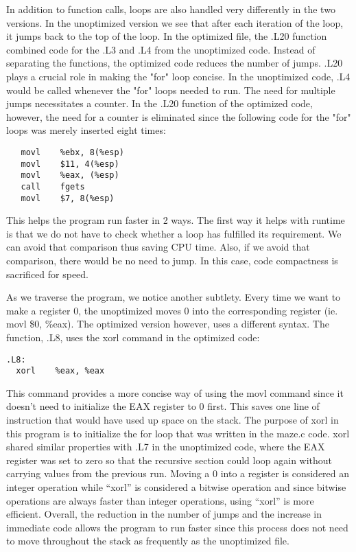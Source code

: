 \documentclass[12pt,letterpaper]{article}
\begin{document}
In addition to function calls, loops are also handled very differently in the two versions. In the unoptimized version we see that after each iteration of the loop, it jumps back to the top of the loop. In the optimized file, the .L20 function combined code for the .L3 and .L4 from the unoptimized code. Instead of separating the functions, the optimized code reduces the number of jumps. .L20 plays a crucial role in making the "for" loop concise. In the unoptimized code, .L4 would be called whenever the "for" loops needed to run. The need for multiple jumps necessitates a counter. In the .L20 function of the optimized code, however, the need for a counter is eliminated since the following code for the "for" loops was merely inserted eight times:
\begin{verbatim}
   movl    %ebx, 8(%esp)
   movl    $11, 4(%esp)
   movl    %eax, (%esp)
   call    fgets
   movl    $7, 8(%esp)
\end{verbatim} 
This helps the program run faster in 2 ways. The first way it helps with runtime is that we do not have to check whether a loop has fulfilled its requirement. We can avoid that comparison thus saving CPU time. Also, if we avoid that comparison, there would be no need to jump. In this case, code compactness is sacrificed for speed.
   
As we traverse the program, we notice another subtlety. Every time we want to make a register 0, the unoptimized moves 0 into the corresponding register (ie. movl \$0, \%eax). The optimized version however, uses a different syntax. The function, .L8, uses the xorl command in the optimized code:
\begin{verbatim}
.L8:
  xorl    %eax, %eax
\end{verbatim}

This command provides a more concise way of using the movl command since it doesn’t need to initialize the EAX register to 0 first. This saves one line of instruction that would have used up space on the stack. The purpose of xorl in this program is to initialize the for loop that was written in the maze.c code. xorl shared similar properties with .L7 in the unoptimized code, where the EAX register was set to zero so that the recursive section could loop again without carrying values from the previous run. Moving a 0 into a register is considered an integer operation while “xorl” is considered a bitwise operation and since bitwise operations are always faster than integer operations, using “xorl” is more efficient. Overall, the reduction in the number of jumps and the increase in immediate code allows the program to run faster since this process does not need to move throughout the stack as frequently as the unoptimized file.
\end{document}
